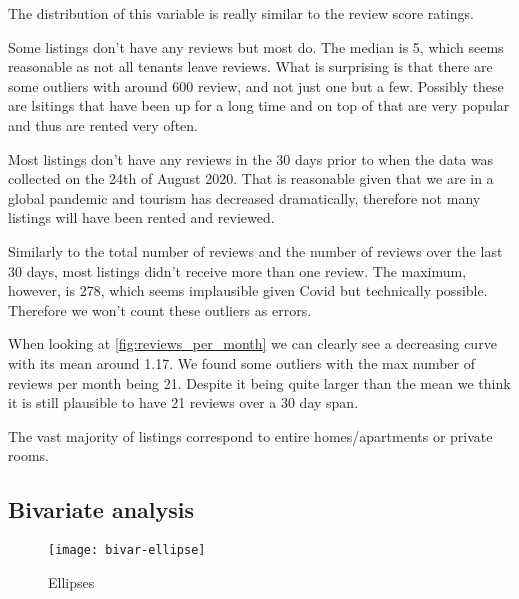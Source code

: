 The distribution of this variable is really similar to the review score ratings.




Some listings don't have any reviews but most do. The median is 5,
which seems reasonable as not all tenants leave reviews. What is
surprising is that there are some outliers with around 600 review,
and not just one but a few. Possibly these are lsitings that have been
up for a long time and on top of that are very popular and thus
are rented very often.


Most listings don't have any reviews in the 30 days prior to
when the data was collected on the 24th of August 2020. 
That is reasonable given that we are
in a global pandemic and tourism has decreased dramatically, therefore
not many \airbnb listings will have been rented and reviewed.



Similarly to the total number of reviews and the number of reviews
over the last 30 days, most listings didn't receive more than one
review. The maximum, however, is 278, which seems implausible given
Covid but technically possible. Therefore we won't count these 
outliers as errors.


When looking at \cref{fig:reviews_per_month} we can clearly see a decreasing
curve with its mean around 1.17. We found some outliers with the max number of
reviews per month being 21. Despite it being quite larger than the mean we think
it is still plausible to have 21 reviews over a 30 day span.


The vast majority of listings correspond to entire homes/apartments or private
rooms.

\pagebreak
\subsection{Bivariate analysis}%
\label{sub:bivariate_analysis}

\begin{figure}[H]
    \centering
    \texttt{[image: bivar-ellipse]}
    \caption{Ellipses}%
    \label{fig:ellipses}
\end{figure}

